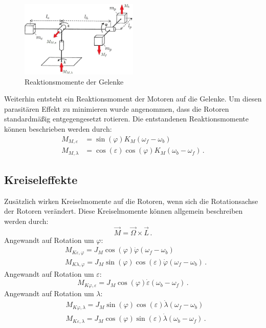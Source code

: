 \documentclass[times, 9pt,twocolumn]{article}
\begin{document}
	\begin{figure}[ht]
	\centering
	\includegraphics[width=0.5\textwidth]{images/setup_mom}
	\caption{Reaktionsmomente der Gelenke}
	\label{setup_mom}
	\end{figure}
	Weiterhin entsteht ein Reaktionsmoment der Motoren auf die Gelenke. Um diesen parasitären Effekt zu minimieren wurde angenommen, dass die Rotoren standardmäßig entgegengesetzt rotieren. Die entstandenen Reaktionsmomente können beschrieben werden durch:
	\begin{subequations}		
	\begin{align}
	M_{M,\varepsilon} &=\sin (\varphi) K_M (\omega_f-\omega_b) \\
	M_{M,\lambda} &=\cos (\varepsilon) \cos (\varphi) K_M (\omega_b-\omega_f)\, .
	\end{align}
\end{subequations}


	\subsection{Kreiseleffekte}

	Zusätzlich wirken Kreiselmomente auf die Rotoren, wenn sich die Rotationsachse der Rotoren verändert. Diese Kreiselmomente können allgemein beschreiben werden durch:
	\begin{equation}
	\vec{M} = \vec{\Omega} \times \vec{L}\, .
	\end{equation}	
	Angewandt auf Rotation um $\varphi$:
	\begin{subequations}
		\begin{align}
		&M_{K\varepsilon,\varphi} = J_M \cos (\varphi) \dot{\varphi}(\omega_f-\omega_b)\\
		&M_{K\lambda,\varphi} = J_M \sin (\varphi) \cos (\varepsilon) \dot{\varphi}(\omega_f-\omega_b)\, .
		\end{align}
	\end{subequations}
	Angewandt auf Rotation um $\varepsilon$:
	\begin{equation}
	M_{K\varphi,\varepsilon} = J_M \cos (\varphi) \dot{\varepsilon}(\omega_b-\omega_f)\, .
	\end{equation}
	Angewandt auf Rotation um $\lambda$:
	\begin{subequations}
		\begin{align}
		&M_{K\varphi,\lambda} = J_M \sin (\varphi) \cos (\varepsilon) \dot{\lambda}(\omega_f-\omega_b)\\
		&M_{K\varepsilon,\lambda} = J_M \cos (\varphi) \sin (\varepsilon) \dot{\lambda}(\omega_b-\omega_f)\, .
		\end{align}
	\end{subequations}
\end{document}
